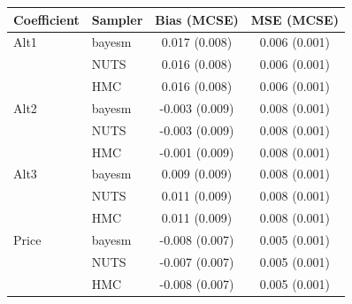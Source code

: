 \begin{tabular}{llcc}
\toprule
Coefficient & Sampler & Bias (MCSE) & MSE (MCSE) \\
\midrule
Alt1 & bayesm & 0.017 (0.008) & 0.006 (0.001) \\
 & NUTS & 0.016 (0.008) & 0.006 (0.001) \\
 & HMC & 0.016 (0.008) & 0.006 (0.001) \\
Alt2 & bayesm & -0.003 (0.009) & 0.008 (0.001) \\
 & NUTS & -0.003 (0.009) & 0.008 (0.001) \\
 & HMC & -0.001 (0.009) & 0.008 (0.001) \\
Alt3 & bayesm & 0.009 (0.009) & 0.008 (0.001) \\
 & NUTS & 0.011 (0.009) & 0.008 (0.001) \\
 & HMC & 0.011 (0.009) & 0.008 (0.001) \\
Price & bayesm & -0.008 (0.007) & 0.005 (0.001) \\
 & NUTS & -0.007 (0.007) & 0.005 (0.001) \\
 & HMC & -0.008 (0.007) & 0.005 (0.001) \\
\bottomrule
\end{tabular}
